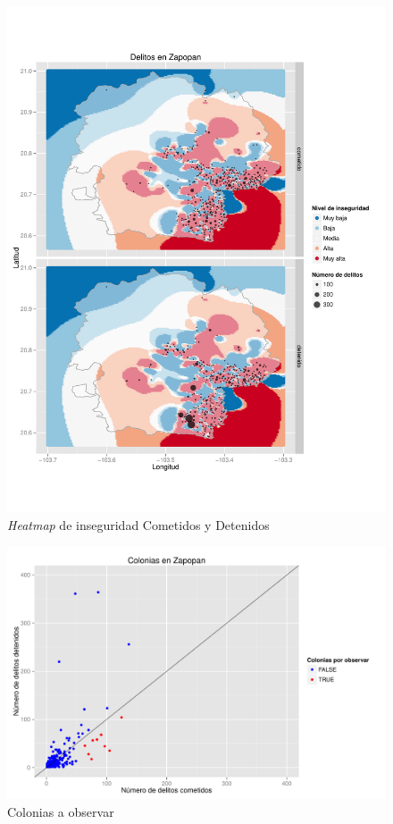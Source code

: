 \begin{figure}[H]
\centering
\caption{\textit{Heatmap} de inseguridad Cometidos y Detenidos}

\includegraphics[width=120mm]{../../graphs/heat_facet.pdf}
\end{figure}



\begin{figure}[H]
\centering
\caption{Colonias a observar}

\includegraphics[width=120mm]{../../graphs/recomendacion.pdf}
\end{figure}




